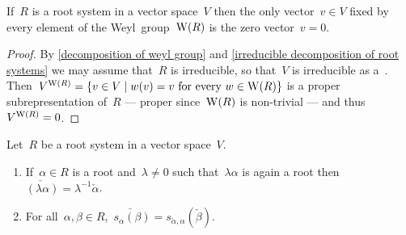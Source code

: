 \begin{corollary}
  \label{weyl group fixes no vector}
  If~$R$ is a root system in a vector space~$V$ then the only vector~$v \in V$ fixed by every element of the Weyl~group~$\operatorname{W}(R)$ is the zero vector~$v = 0$.
\end{corollary}


\begin{proof}
  By \cref{decomposition of weyl group} and \cref{irreducible decomposition of root systems} we may assume that~$R$ is irreducible, so that~$V$ is irreducible as a~{}.
  Then~$V^{\Weyl(R)} = \{v \in V \suchthat \text{$w(v) = v$ for every~$w \in \Weyl(R)$}\}$ is a proper subrepresentation of~$R$ --- proper since~$\operatorname{W}(R)$ is non-trivial --- and thus~$V^{\operatorname{W}(R)} = 0$.
\end{proof}


\begin{lemma}
  \label{properties of coroots}
  Let~$R$ be a root system in a vector space~$V$.
  \begin{enumerate}
    \item
      If~$\alpha \in R$ is a root and~$\lambda \neq 0$ such that~$\lambda \alpha$ is again a root then~$\check{(\lambda \alpha)} = \lambda^{-1} \check{\alpha}$.
    \item
      For all~$\alpha, \beta \in R$,~$\check{s_\alpha(\beta)} = s_{\check{\alpha}, \alpha}(\check{\beta})$.
  \end{enumerate}
\end{lemma}


